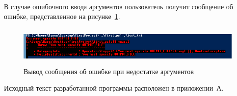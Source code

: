 В случае ошибочного ввода аргументов пользователь получит сообщение об ошибке,
представленное на рисунке~\ref{fig:error}.

\begin{figure}[htbp]
  \centering
  \includegraphics[width=150mm,height=20mm]{img/error}
  \caption{Вывод сообщения об ошибке при недостатке аргументов}\label{fig:error}
\end{figure}

Исходный текст разработанной программы расположен в приложении~А.

\newpage
